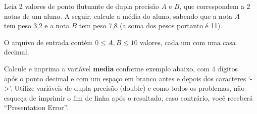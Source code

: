 
%
%
%

Leia 2 valores de ponto flutuante de dupla precisão $A$ e $B$, que correspondem a 2 notas de um aluno. A seguir, calcule a média do aluno, sabendo que a nota $A$ tem peso 3,2 e a nota $B$ tem peso 7,8 (a soma dos pesos portanto é 11).

\Entrada%
O arquivo de entrada contém $0 \leq A, B \leq 10$ valores, cada um com uma casa decimal.

\Saida%
Calcule e imprima a variável \textbf{media} conforme exemplo abaixo, com 4 dígitos após o ponto decimal e com um espaço em branco antes e depois dos caracteres `->'. Utilize variáveis de dupla precisão (double) e como todos os problemas, não esqueça de imprimir o fim de linha após o resultado, caso contrário, você receberá ``Presentation Error''.

%
